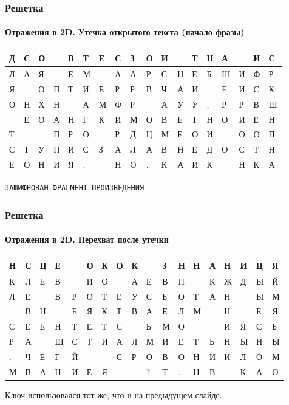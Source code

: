 \begin{frame}[fragile]
    \frametitle{Решетка}
    \framesubtitle{Отражения в 2D. Утечка открытого текста (начало фразы)}
    
    \begin{table}[ht]
        \centering
        \begin{tabular}[c]{|l@{}|l@{}|l@{}|l@{}|l@{}|l@{}|l@{}|l@{}|l@{}|l@{}|l@{}|l@{}|l@{}|l@{}|l@{}|l@{}|l@{}|l@{}|}
            \hline
            Д&С&О& &В&Т&Е&С&З&О&И& &Т&Н&А& &И&С\\ \hline 
            Л&А&Я& &Е&М& &А&А&Р&С&Н&Е&Б&Ш&И&Ф&Р\\ \hline 
            Я& &О&П&Т&И&Е&Р&Р&В&Ч&А&И& &Е&И&С&К\\ \hline 
            О&Н&Х&Н& &А&М&Ф&Р& &А&У&У&,&Р&Р&В&Ш\\ \hline 
             &Е&О&А&Н&Г&К&И&М&О&В&Е&Т&Н&О&И&Е&Н\\ \hline 
            Т& & &П&Р&О& &Р&Д&Ц&М&Е&О&И& &О&О&П\\ \hline 
            С&Т&У&П&И&С&З&А&Л&А&В&Н&Е&Д&О&С&Т&Н\\ \hline 
            Е&О&Н&И&Я&,& &Н&О&.&К&А&И&К& &Н&К&А\\ \hline 
        \end{tabular}
    \end{table}
\begin{verbatim}
ЗАШИФРОВАН ФРАГМЕНТ ПРОИЗВЕДЕНИЯ
\end{verbatim}
\end{frame}


\begin{frame}[fragile]
    \frametitle{Решетка}
    \framesubtitle{Отражения в 2D. Перехват после утечки}
    
    \begin{table}[ht]
        \centering
        \begin{tabular}[c]{|l@{}|l@{}|l@{}|l@{}|l@{}|l@{}|l@{}|l@{}|l@{}|l@{}|l@{}|l@{}|l@{}|l@{}|l@{}|l@{}|l@{}|l@{}|}
            \hline
            Н&С&Ц&Е& &О&К&О&К& &З&Н&Н&А&Н&И&Ц&Я\\ \hline 
            К&Л&Е&В& &И&О& &А&Е&В&П& &К&Ж&Д&Ы&Й\\ \hline 
            Л&Е& &В&Р&О&Т&Е&У&С&Б&О&Т&А&Н& &Ы&М\\ \hline 
             &В&Н& &Е&Я&К&Т&В&А&Е&Л&М& &Н& &Е&Я\\ \hline 
            С&Е&Е&Н&Т&Е&Т&С& &Ь&М&О& & &И&Я&С&Б\\ \hline 
            Р&А& &Щ&С&Т&И&А&Л&М&И&Е&Т&Ь&Н&Ы&Н&Ы\\ \hline 
            .&Ч&Е&Г&Й& & &С&Р&О&В&О&Н&И&И&Л&О&М\\ \hline 
            М&В&А&Н&И&Е&Я& & &?&Т&.&Н&В& &К&А&О\\ \hline 
        \end{tabular}
    \end{table}
    Ключ использовался тот же, что и на предыдущем слайде.
\end{frame}


